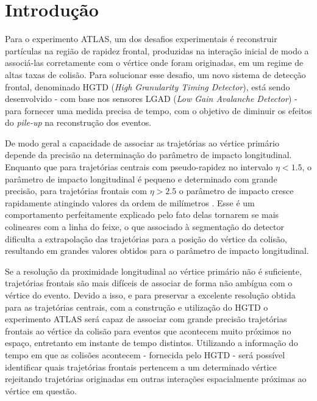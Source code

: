 \chapter{Introdução}

Para o experimento ATLAS, um dos desafios experimentais é reconstruir partículas na região de rapidez frontal, produzidas na interação inicial de modo a associá-las corretamente com o vértice onde foram originadas, em um regime de altas taxas de colisão. Para solucionar esse desafio, um novo sistema de detecção frontal, denominado HGTD ({\it High Granularity Timing Detector}), está sendo desenvolvido - com base nos sensores LGAD ({\it Low Gain Avalanche Detector}) - para fornecer uma medida precisa de tempo, com o objetivo de diminuir os efeitos do {\it pile-up} na reconstrução dos eventos. 

De modo geral a capacidade de associar as trajetórias ao vértice primário depende da precisão na determinação do parâmetro de impacto longitudinal. Enquanto que para trajetórias centrais com pseudo-rapidez no intervalo $\eta<1.5$, o parâmetro de impacto longitudinal é pequeno e determinado com grande precisão, para trajetórias frontais com $\eta>2.5$ o parâmetro de impacto cresce rapidamente atingindo valores da ordem de milímetros \cite{tdr}. Esse é um comportamento perfeitamente explicado pelo fato delas tornarem se mais colineares com a linha do feixe, o que associado à segmentação do detector dificulta a extrapolação das trajetórias para a posição do vértice da colisão, resultando em grandes valores obtidos para o parâmetro de impacto longitudinal.

Se a resolução da proximidade longitudinal ao vértice primário não é suficiente, trajetórias frontais são mais difíceis de associar de forma não ambígua com o vértice do evento. Devido a isso, e para preservar a excelente resolução obtida para as trajetórias centrais, com a construção e utilização do HGTD o experimento ATLAS será capaz de associar com grande precisão trajetórias frontais ao vértice da colisão para eventos que acontecem muito próximos no espaço, entretanto em instante de tempo distintos. Utilizando a informação do tempo em que as colisões acontecem - fornecida pelo HGTD - será possível identificar quais trajetórias frontais pertencem a um determinado vértice rejeitando trajetórias originadas em outras interações espacialmente próximas ao vértice em questão. 

